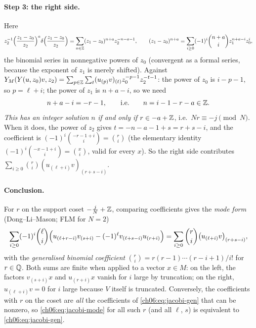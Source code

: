 \paragraph{Step 3: the right side.}  Here
\begin{equation*}
  z_2^{-1}\Bigl(\frac{z_1-z_0}{z_2}\Bigr)^{a}\delta\Bigl(\frac{z_1-z_0}{z_2}\Bigr)
  =\sum_{n\in{\mathbb{Z}}}(z_1-z_0)^{n+a}z_2^{-n-a-1},\qquad
  (z_1-z_0)^{n+a}=\sum_{i\ge0}(-1)^i\binom{n+a}{i}z_1^{n+a-i}z_0^{i},
\end{equation*}
the binomial series in nonnegative powers of $z_0$ (convergent as a formal series, because the
exponent of $z_1$ is merely shifted).  Against $Y_M(Y(u,z_0)v,z_2)=\sum_{p\in{\mathbb{Z}}}\sum_t
(u_{(p)}v)_{(t)}z_0^{-p-1}z_2^{-t-1}$: the power of $z_0$ is $i-p-1$, so $p=\ell+i$; the power of
$z_1$ is $n+a-i$, so we need
\begin{equation}\label{ch06:eq:cosetcond}
  n+a-i=-r-1,\qquad\text{i.e.}\qquad n=i-1-r-a\in{\mathbb{Z}} .
\end{equation}
\emph{This has an integer solution $n$ if and only if $r\in-a+{\mathbb{Z}}$}, i.e.\ $Nr\equiv -j\pmod N$.
When it does, the power of $z_2$ gives $t=-n-a-1+s=r+s-i$, and the coefficient is
$(-1)^i\binom{-r-1+i}{i}=\binom ri$ (the elementary identity
$(-1)^i\binom{-x-1+i}{i}=\binom xi$, valid for every $x$).  So the right side contributes
$\sum_{i\ge0}\binom ri(u_{(\ell+i)}v)_{(r+s-i)}$.

\paragraph{Conclusion.}  For $r$ on the support coset $-\frac jN+{\mathbb{Z}}$, comparing coefficients gives
the \emph{mode form} (Dong--Li--Mason; FLM for $N=2$)
\begin{equation}\label{ch06:eq:jacobi-mode}
  \sum_{i\ge0}(-1)^i\binom{\ell}{i}\Bigl(u_{(\ell+r-i)}v_{(s+i)}
     -(-1)^{\ell}v_{(\ell+s-i)}u_{(r+i)}\Bigr)
  =\sum_{i\ge0}\binom{r}{i}\bigl(u_{(\ell+i)}v\bigr)_{(r+s-i)},
\end{equation}
with the \emph{generalised binomial coefficient} $\binom{r}{i}=r(r-1)\cdots(r-i+1)/i!$ for
$r\in{\mathbb{Q}}$.  Both sums are finite when applied to a vector $x\in M$: on the left, the factors
$v_{(s+i)}x$ and $u_{(r+i)}x$ vanish for $i$ large by truncation; on the right, $u_{(\ell+i)}v=0$
for $i$ large because $V$ itself is truncated.  Conversely, the coefficients with $r$ on the coset
are \emph{all} the coefficients of \eqref{ch06:eq:jacobi-gen} that can be nonzero, so
\eqref{ch06:eq:jacobi-mode} for all such $r$ (and all $\ell$, $s$) is equivalent to
\eqref{ch06:eq:jacobi-gen}.

